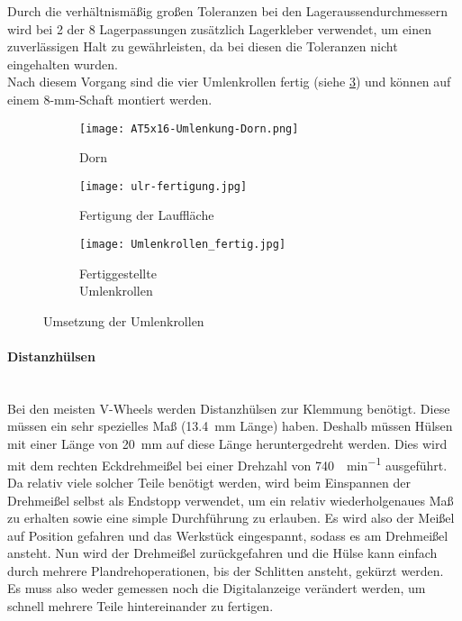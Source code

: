     Durch die verhältnismäßig großen Toleranzen bei den Lageraussendurchmessern wird bei 2 der 8 Lagerpassungen zusätzlich Lagerkleber verwendet, um einen zuverlässigen Halt zu gewährleisten, da bei diesen die Toleranzen nicht eingehalten wurden.\\
    Nach diesem Vorgang sind die vier Umlenkrollen fertig (siehe \ref{ulr:f2}) und können auf einem 8-mm-Schaft montiert werden.

    \begin{figure}[H]
        \centering
        \begin{subfigure}{.3\textwidth}
            \centering
            \texttt{[image: AT5x16-Umlenkung-Dorn.png]}
            \caption{Dorn}
            \label{ulr:dorn}
        \end{subfigure}%
        \begin{subfigure}{.3\textwidth}
            \centering
            \texttt{[image: ulr-fertigung.jpg]}
            \caption{Fertigung der Lauffläche}
            \label{ulr:f1}
        \end{subfigure}%
        \begin{subfigure}{.3\textwidth}
            \centering
            \texttt{[image: Umlenkrollen\_fertig.jpg]}
            \centering
            \caption{Fertiggestellte \\Umlenkrollen}
            \label{ulr:f2}
        \end{subfigure}
        \caption{Umsetzung der Umlenkrollen}
        \label{ulr}
    \end{figure}

\paragraph{Distanzhülsen}\mbox{}\\
Bei den meisten V-Wheels werden Distanzhülsen zur Klemmung benötigt. Diese müssen ein sehr spezielles Maß (\SI{13.4}{\mm} Länge) haben. Deshalb müssen Hülsen mit einer Länge von \SI{20}{\mm} auf diese Länge heruntergedreht werden. Dies wird mit dem rechten Eckdrehmeißel bei einer Drehzahl von \SI{740}{\Umdrehung\per\minute} ausgeführt. Da relativ viele solcher Teile benötigt werden, wird beim Einspannen der Drehmeißel selbst als Endstopp verwendet, um ein relativ wiederholgenaues Maß zu erhalten sowie eine simple Durchführung zu erlauben. Es wird also der Meißel auf Position gefahren und das Werkstück eingespannt, sodass es am Drehmeißel ansteht. Nun wird der Drehmeißel zurückgefahren und die Hülse kann einfach durch mehrere Plandrehoperationen, bis der Schlitten ansteht, gekürzt werden. Es muss also weder gemessen noch die Digitalanzeige verändert werden, um schnell mehrere Teile hintereinander zu fertigen.

